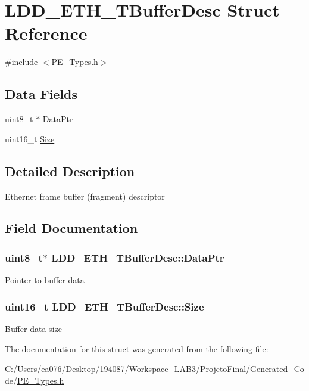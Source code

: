 \hypertarget{struct_l_d_d___e_t_h___t_buffer_desc}{\section{L\-D\-D\-\_\-\-E\-T\-H\-\_\-\-T\-Buffer\-Desc Struct Reference}
\label{struct_l_d_d___e_t_h___t_buffer_desc}
}


{\ttfamily \#include $<$P\-E\-\_\-\-Types.\-h$>$}

\subsection*{Data Fields}
\begin{DoxyCompactItemize}
\item 
uint8\-\_\-t $\ast$ \hyperlink{struct_l_d_d___e_t_h___t_buffer_desc_af9049f0d40faa480a4de3532a1de4605}{Data\-Ptr}
\item 
uint16\-\_\-t \hyperlink{struct_l_d_d___e_t_h___t_buffer_desc_abddc4273b732d3cf44ff0b6870d6b87a}{Size}
\end{DoxyCompactItemize}


\subsection{Detailed Description}
Ethernet frame buffer (fragment) descriptor 

\subsection{Field Documentation}
\hypertarget{struct_l_d_d___e_t_h___t_buffer_desc_af9049f0d40faa480a4de3532a1de4605}{
\subsubsection[{Data\-Ptr}]{\setlength{\rightskip}{0pt plus 5cm}uint8\-\_\-t$\ast$ L\-D\-D\-\_\-\-E\-T\-H\-\_\-\-T\-Buffer\-Desc\-::\-Data\-Ptr}}\label{struct_l_d_d___e_t_h___t_buffer_desc_af9049f0d40faa480a4de3532a1de4605}
Pointer to buffer data \hypertarget{struct_l_d_d___e_t_h___t_buffer_desc_abddc4273b732d3cf44ff0b6870d6b87a}{
\subsubsection[{Size}]{\setlength{\rightskip}{0pt plus 5cm}uint16\-\_\-t L\-D\-D\-\_\-\-E\-T\-H\-\_\-\-T\-Buffer\-Desc\-::\-Size}}\label{struct_l_d_d___e_t_h___t_buffer_desc_abddc4273b732d3cf44ff0b6870d6b87a}
Buffer data size 

The documentation for this struct was generated from the following file\-:\begin{DoxyCompactItemize}
\item 
C\-:/\-Users/ea076/\-Desktop/194087/\-Workspace\-\_\-\-L\-A\-B3/\-Projeto\-Final/\-Generated\-\_\-\-Code/\hyperlink{_p_e___types_8h}{P\-E\-\_\-\-Types.\-h}\end{DoxyCompactItemize}
